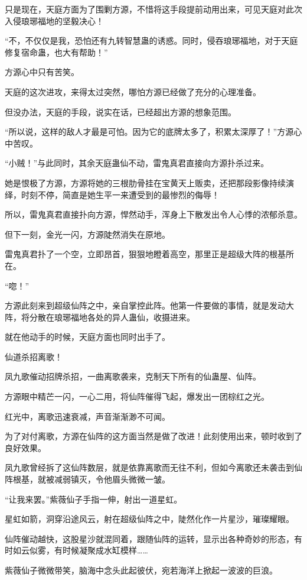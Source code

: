 \begin{this_body}
只是现在，天庭方面为了围剿方源，不惜将这手段提前动用出来，可见天庭对此次入侵琅琊福地的坚毅决心！

“不，不仅仅是我，恐怕还有九转智慧蛊的诱惑。同时，侵吞琅琊福地，对于天庭修复宿命蛊，也大有帮助！”

方源心中只有苦笑。

天庭的这次进攻，来得太过突然，哪怕方源已经做了充分的心理准备。

但没办法，天庭的手段，说实在话，已经超出方源的想象范围。

“所以说，这样的敌人才最是可怕。因为它的底牌太多了，积累太深厚了！”方源心中苦叹。

“小贼！”与此同时，其余天庭蛊仙不动，雷鬼真君直接向方源扑杀过来。

她是恨极了方源，方源将她的三根肋骨挂在宝黄天上贩卖，还把那段影像持续演绎，时刻不停，简直是她生平一来遭受到的最惨烈的侮辱！

所以，雷鬼真君直接扑向方源，悍然动手，浑身上下散发出令人心悸的浓郁杀意。

但下一刻，金光一闪，方源陡然消失在原地。

雷鬼真君扑了一个空，立即昂首，狠狠地瞪着高空，那里正是超级大阵的根基所在。

“唿！”

方源此刻来到超级仙阵之中，亲自掌控此阵。他第一件要做的事情，就是发动大阵，将分散在琅琊福地各处的异人蛊仙，收摄进来。

就在他动手的时候，天庭方面也同时出手了。

仙道杀招离歌！

凤九歌催动招牌杀招，一曲离歌袭来，克制天下所有的仙蛊屋、仙阵。

方源眼中精芒一闪，一心二用，将仙阵催得飞起，爆发出一团棕红之光。

红光中，离歌迅速衰减，声音渐渐渺不可闻。

为了对付离歌，方源在仙阵的这方面当然是做了改进！此刻使用出来，顿时收到了良好效果。

凤九歌曾经拆了这仙阵数层，就是依靠离歌而无往不利，但如今离歌还未袭击到仙阵根基，就被减弱镇灭，令他眉头微微一皱。

“让我来罢。”紫薇仙子手指一伸，射出一道星虹。

星虹如箭，洞穿沿途风云，射在超级仙阵之中，陡然化作一片星沙，璀璨耀眼。

仙阵催动越快，这股星沙就混同着，跟随仙阵的运转，显示出各种奇妙的形态，有时如云似雾，有时候凝聚成水缸模样……

紫薇仙子微微带笑，脑海中念头此起彼伏，宛若海洋上掀起一波波的巨浪。


\end{this_body}
